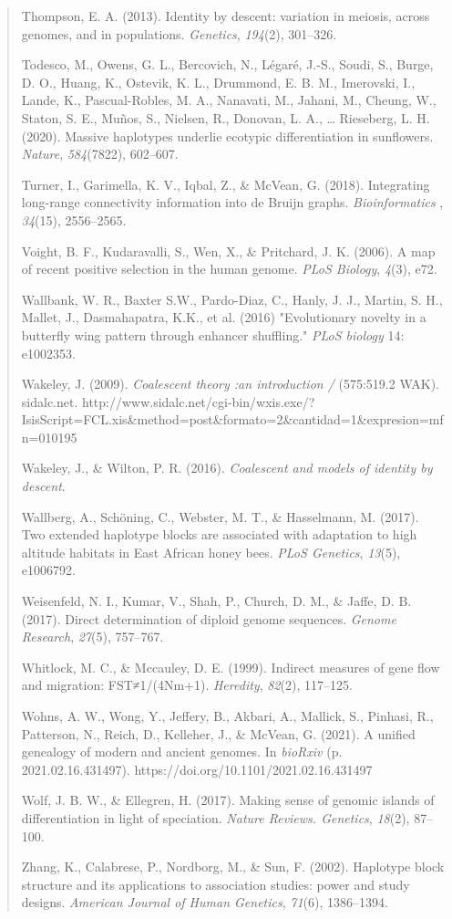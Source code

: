 \documentclass[
]{article}
\begin{document}
\begin{quote}
Thompson, E. A. (2013). Identity by descent: variation in meiosis,
across genomes, and in populations. \emph{Genetics}, \emph{194}(2),
301--326.

Todesco, M., Owens, G. L., Bercovich, N., Légaré, J.-S., Soudi, S.,
Burge, D. O., Huang, K., Ostevik, K. L., Drummond, E. B. M., Imerovski,
I., Lande, K., Pascual-Robles, M. A., Nanavati, M., Jahani, M., Cheung,
W., Staton, S. E., Muños, S., Nielsen, R., Donovan, L. A., \ldots{}
Rieseberg, L. H. (2020). Massive haplotypes underlie ecotypic
differentiation in sunflowers. \emph{Nature}, \emph{584}(7822),
602--607.

Turner, I., Garimella, K. V., Iqbal, Z., \& McVean, G. (2018).
Integrating long-range connectivity information into de Bruijn graphs.
\emph{Bioinformatics} , \emph{34}(15), 2556--2565.

Voight, B. F., Kudaravalli, S., Wen, X., \& Pritchard, J. K. (2006). A
map of recent positive selection in the human genome. \emph{PLoS
Biology}, \emph{4}(3), e72.

Wallbank, W. R., Baxter S.W., Pardo-Diaz, C., Hanly, J. J., Martin, S.
H., Mallet, J., Dasmahapatra, K.K., et al. (2016) "Evolutionary novelty
in a butterfly wing pattern through enhancer shuffling." \emph{PLoS
biology} 14: e1002353.

Wakeley, J. (2009). \emph{Coalescent theory :an introduction /}
(575:519.2 WAK). sidalc.net.
http://www.sidalc.net/cgi-bin/wxis.exe/?IsisScript=FCL.xis\&method=post\&formato=2\&cantidad=1\&expresion=mfn=010195

Wakeley, J., \& Wilton, P. R. (2016). \emph{Coalescent and models of
identity by descent}.

Wallberg, A., Schöning, C., Webster, M. T., \& Hasselmann, M. (2017).
Two extended haplotype blocks are associated with adaptation to high
altitude habitats in East African honey bees. \emph{PLoS Genetics},
\emph{13}(5), e1006792.

Weisenfeld, N. I., Kumar, V., Shah, P., Church, D. M., \& Jaffe, D. B.
(2017). Direct determination of diploid genome sequences. \emph{Genome
Research}, \emph{27}(5), 757--767.

Whitlock, M. C., \& Mccauley, D. E. (1999). Indirect measures of gene
flow and migration: FST≠1/(4Nm+1). \emph{Heredity}, \emph{82}(2),
117--125.

Wohns, A. W., Wong, Y., Jeffery, B., Akbari, A., Mallick, S., Pinhasi,
R., Patterson, N., Reich, D., Kelleher, J., \& McVean, G. (2021). A
unified genealogy of modern and ancient genomes. In \emph{bioRxiv} (p.
2021.02.16.431497). https://doi.org/10.1101/2021.02.16.431497

Wolf, J. B. W., \& Ellegren, H. (2017). Making sense of genomic islands
of differentiation in light of speciation. \emph{Nature Reviews.
Genetics}, \emph{18}(2), 87--100.

Zhang, K., Calabrese, P., Nordborg, M., \& Sun, F. (2002). Haplotype
block structure and its applications to association studies: power and
study designs. \emph{American Journal of Human Genetics}, \emph{71}(6),
1386--1394.
\end{quote}
\end{document}
